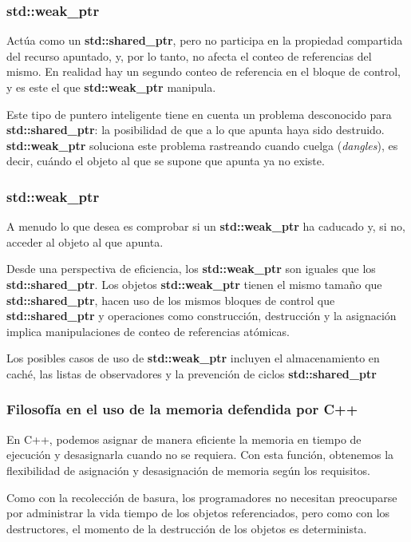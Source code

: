\documentclass{beamer}
\begin{document}
	\begin{frame}
		\frametitle{std::weak\_ptr}
		Actúa como un \textbf{std::shared\_ptr}, pero no participa en la propiedad compartida del recurso apuntado, y, por lo tanto, no afecta el conteo de referencias del mismo. En realidad hay un segundo conteo de referencia en el bloque de control, y es este el que \textbf{std::weak\_ptr} manipula.
		
		Este tipo de puntero inteligente tiene en cuenta un problema desconocido para \textbf{std::shared\_ptr}: la posibilidad de que a lo que apunta haya sido destruido. \textbf{std::weak\_ptr} soluciona este problema rastreando cuando cuelga (\textit{dangles}), es decir, cu\'ando el objeto al que se supone que apunta ya no existe.
	\end{frame}
	
	\begin{frame}
		\frametitle{std::weak\_ptr}
		A menudo lo que desea es comprobar si un \textbf{std::weak\_ptr} ha caducado y, si no, acceder al objeto al que apunta. 
		
		Desde una perspectiva de eficiencia, los \textbf{std::weak\_ptr} son iguales que los \textbf{std::shared\_ptr}. Los objetos \textbf{std::weak\_ptr} tienen el mismo tamaño que \textbf{std::shared\_ptr}, hacen uso de los mismos bloques de control que \textbf{std::shared\_ptr} y operaciones como construcción, destrucción y la asignación implica manipulaciones de conteo de referencias atómicas. 
		
		Los posibles casos de uso de \textbf{std::weak\_ptr} incluyen el almacenamiento en caché, las listas de observadores y la prevención de ciclos \textbf{std::shared\_ptr}
	\end{frame}

	\begin{frame}
		\frametitle{Filosofía en el uso de la memoria defendida por C++}
		
		En C++, podemos asignar de manera eficiente la memoria en tiempo de ejecución y desasignarla cuando no se requiera. Con esta función, obtenemos la flexibilidad de asignación y desasignación de memoria según los requisitos.
		
		Como con la recolección de basura, los programadores no necesitan preocuparse por administrar la vida tiempo de los objetos referenciados, pero como con los destructores, el momento de la destrucción de los objetos es determinista.
	\end{frame}
\end{document}
